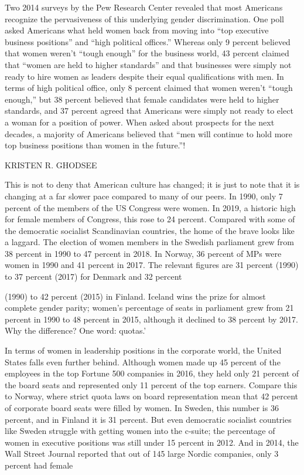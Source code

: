  \par 
Two 2014 surveys by the Pew Research Center revealed that most Americans recognize the pervasiveness of this underlying gender discrimination. One poll asked Americans what held women back from moving into “top executive business positions” and “high political offices.” Whereas only {\color{blue}9} percent believed that women weren't “tough enough” for the business world, {\color{blue}43} percent claimed that “women are held to higher standards” and that businesses were simply not ready to hire women as leaders despite their equal qualifications with men. In terms of high political office, only {\color{blue}8} percent claimed that women weren't “tough enough,” but {\color{blue}38} percent believed that female candidates were held to higher standards, and {\color{blue}37} percent agreed that Americans were simply not ready to elect a woman for a position of power. When asked about prospects for the next decades, a majority of Americans believed that “men will continue to hold more top business positions than women in the future.”!
 \par 
KRISTEN R. GHODSEE
 \par 
This is not to deny that American culture has changed; it is just to note that it is changing at a far slower pace compared to many of our peers. In 1990, only {\color{blue}7} percent of the members of the US Congress were women. In 2019, a historic high for female members of Congress, this rose to {\color{blue}24} percent. Compared with some of the democratic socialist Scandinavian countries, the home of the brave looks like a laggard. The election of women members in the Swedish parliament grew from {\color{blue}38} percent in 1990 to {\color{blue}47} percent in 2018. In Norway, {\color{blue}36} percent of MPs were women in 1990 and {\color{blue}41} percent in 2017. The relevant figures are {\color{blue}31} percent (1990) to {\color{blue}37} percent (2017) for Denmark and {\color{blue}32} percent
 \par 
(1990) to {\color{blue}42} percent (2015) in Finland. Iceland wins the prize for almost complete gender parity; women’s percentage of seats in parliament grew from {\color{blue}21} percent in 1990 to {\color{blue}48} percent in 2015, although it declined to {\color{blue}38} percent by 2017. Why the difference? One word: quotas.’
 \par 
In terms of women in leadership positions in the corporate world, the United States falls even further behind. Although women made up {\color{blue}45} percent of the employees in the top Fortune {\color{blue}500} companies in 2016, they held only {\color{blue}21} percent of the board seats and represented only {\color{blue}11} percent of the top earners. Compare this to Norway, where strict quota laws on board representation mean that {\color{blue}42} percent of corporate board seats were filled by women. In Sweden, this number is {\color{blue}36} percent, and in Finland it is {\color{blue}31} percent. But even democratic socialist countries like Sweden struggle with getting women into the c-suite; the percentage of women in executive positions was still under {\color{blue}15} percent in 2012. And in 2014, the Wall Street Journal reported that out of {\color{blue}145} large Nordic companies, only {\color{blue}3} percent had female
